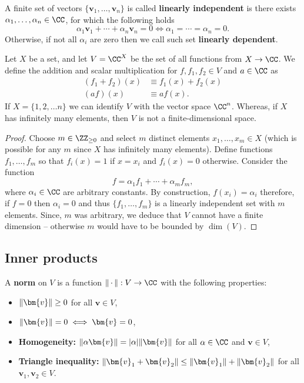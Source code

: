 \documentclass[12pt, a4paper]{article}
\begin{document}
\begin{definition}
    A finite set of vectors \(\{\bm{v}_1 , \ldots ,\bm{v}_n\}\)     is called \textbf{linearly independent} is there exists \(\alpha_1, \ldots, \alpha_n \in \CC\), for which the following holds
    \[\alpha_1 \bm{v}_1 + \cdots + \alpha_n \bm{v}_n =0 \iff \alpha_1 = \cdots = \alpha_n = 0.\] 
    Otherwise, if not all \(\alpha_i\) are zero then we call such set \textbf{linearly dependent}.
\end{definition}

\begin{mdexample}
    Let \(X\) be a set, and let \(V = \CC^X\) be the set of all functions from \(X \to \CC\). We define the addition and scalar multiplication for \(f,f_1,f_2 \in V\) and \(a \in \CC\) as 
    \[\begin{aligned}
        (f_1+f_2)(x) &\equiv f_1(x)+f_2(x) \\
        (af)(x) &\equiv af(x).
    \end{aligned}\]
    If \(X = \{1,2, \ldots n\}\)  we can identify \(V\) with the vector space \(\CC^n\). Whereas, if \(X\) has infinitely many elements, then \(V\) is not a finite-dimensional space. 
    \begin{proof}
        Choose \(m \in \ZZ_{\geq 0}\) and select \(m\) distinct elements \(x_1, \ldots, x_m \in X\) (which is possible for any \(m\) since \(X\) has infinitely many elements). Define functions \(f_1, \ldots, f_m\) so that \(f_i(x)=1\) if \(x=x_i\) and \(f_i(x)=0\) otherwise. Consider the function
        \[f = \alpha_1 f_1 + \cdots + \alpha_m f_m,\]
        where \(\alpha_i \in \CC\) are arbitrary constants. By construction, \(f(x_i) = \alpha_i\) therefore, if \(f=0\) then \(\alpha_i=0\) and thus \(\{f_1,\ldots,f_m\}\) is a linearly independent set with \(m\) elements. Since, \(m\) was arbitrary, we deduce that \(V\) cannot have a finite dimension -- otherwise \(m\) would have to be bounded by \(\dim(V)\).
    \end{proof}
\end{mdexample}

\subsection{Inner products}

\begin{definition}
    A \textbf{norm} on \(V\) is a function \(\norm{\, \cdot \,} :V \to \CC\) with the following properties:
    \begin{itemize}
        \item \(\norm{\bm{v}} \geq 0\) for all \(\bm{v} \in V\),
        \item \(\norm{\bm{v}} = 0 \iff \bm{v}= 0\),
        \item \textbf{Homogeneity:} \(\norm{\alpha \bm{v}}= \abs{\alpha} \norm{\bm{v}}\) for all \(\alpha \in \CC\) and \(\bm{v} \in V\),
        \item \textbf{Triangle inequality:} \(\norm{\bm{v}_1+\bm{v}_2} \leq \norm{\bm{v}_1}+\norm{\bm{v}_2}\) for all \(\bm{v}_1,\bm{v}_2 \in V\).
    \end{itemize}
\end{definition}
\end{document}
